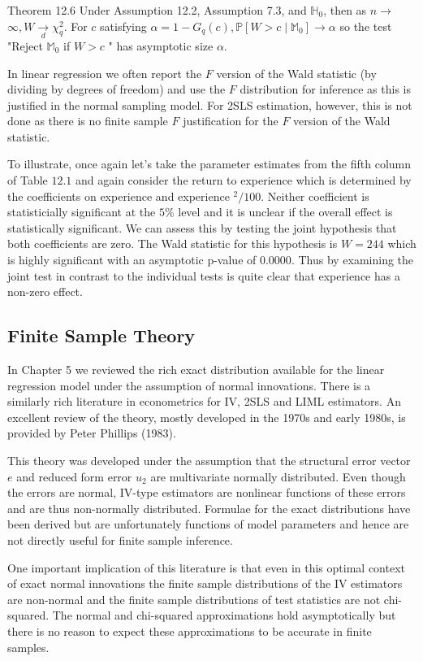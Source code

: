 \documentclass[10pt]{article}
\begin{document}
Theorem 12.6 Under Assumption 12.2, Assumption 7.3, and $\mathbb{H}_{0}$, then as $n \rightarrow$ $\infty, W \underset{d}{\rightarrow} \chi_{q}^{2}$. For $c$ satisfying $\alpha=1-G_{q}(c), \mathbb{P}\left[W>c \mid \mathbb{M}_{0}\right] \longrightarrow \alpha$ so the test "Reject $\mathbb{M}_{0}$ if $W>c$ " has asymptotic size $\alpha$.

In linear regression we often report the $F$ version of the Wald statistic (by dividing by degrees of freedom) and use the $F$ distribution for inference as this is justified in the normal sampling model. For 2SLS estimation, however, this is not done as there is no finite sample $F$ justification for the $F$ version of the Wald statistic.

To illustrate, once again let's take the parameter estimates from the fifth column of Table $12.1$ and again consider the return to experience which is determined by the coefficients on experience and experience $^{2} / 100$. Neither coefficient is statisticially significant at the $5 \%$ level and it is unclear if the overall effect is statistically significant. We can assess this by testing the joint hypothesis that both coefficients are zero. The Wald statistic for this hypothesis is $W=244$ which is highly significant with an asymptotic p-value of $0.0000$. Thus by examining the joint test in contrast to the individual tests is quite clear that experience has a non-zero effect.

\subsection{Finite Sample Theory}
In Chapter 5 we reviewed the rich exact distribution available for the linear regression model under the assumption of normal innovations. There is a similarly rich literature in econometrics for IV, 2SLS and LIML estimators. An excellent review of the theory, mostly developed in the 1970s and early 1980s, is provided by Peter Phillips (1983).

This theory was developed under the assumption that the structural error vector $e$ and reduced form error $u_{2}$ are multivariate normally distributed. Even though the errors are normal, IV-type estimators are nonlinear functions of these errors and are thus non-normally distributed. Formulae for the exact distributions have been derived but are unfortunately functions of model parameters and hence are not directly useful for finite sample inference.

One important implication of this literature is that even in this optimal context of exact normal innovations the finite sample distributions of the IV estimators are non-normal and the finite sample distributions of test statistics are not chi-squared. The normal and chi-squared approximations hold asymptotically but there is no reason to expect these approximations to be accurate in finite samples.
\end{document}
